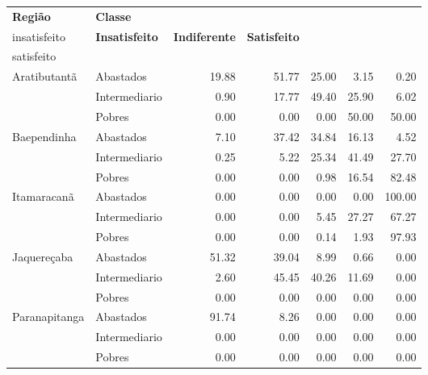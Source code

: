 \begin{table}[h]
\scriptsize
\centering
\label{tabela:q20p}
\begin{tabular}{ll rrrrr}
  \toprule
\textbf{Região}    & \textbf{Classe}  & \textbf{\specialcell{c}{Muito\\insatisfeito}} & \textbf{Insatisfeito} & \textbf{Indiferente} & \textbf{Satisfeito} & \textbf{\specialcell{c}{Muito\\satisfeito}}\\ 
   \midrule
Aratibutantã  & Abastados               &              19.88 &        51.77 &       25.00 &       3.15 &             0.20 \\ 
                & Intermediario           &               0.90 &        17.77 &       49.40 &      25.90 &             6.02 \\ 
                & Pobres                  &               0.00 &         0.00 &        0.00 &      50.00 &            50.00 \\ 
\midrule
  Baependinha   & Abastados               &               7.10 &        37.42 &       34.84 &      16.13 &             4.52 \\ 
                & Intermediario           &               0.25 &         5.22 &       25.34 &      41.49 &            27.70 \\ 
                & Pobres                  &               0.00 &         0.00 &        0.98 &      16.54 &            82.48 \\ 
\midrule
     Itamaracanã   & Abastados               &               0.00 &         0.00 &        0.00 &       0.00 &           100.00 \\ 
                & Intermediario           &               0.00 &         0.00 &        5.45 &      27.27 &            67.27 \\ 
                & Pobres                  &               0.00 &         0.00 &        0.14 &       1.93 &            97.93 \\ 
\midrule
     Jaquereçaba   & Abastados               &              51.32 &        39.04 &        8.99 &       0.66 &             0.00 \\ 
                & Intermediario           &               2.60 &        45.45 &       40.26 &      11.69 &             0.00 \\ 
                & Pobres                  &               0.00 &         0.00 &        0.00 &       0.00 &             0.00 \\ 
\midrule
     Paranapitanga & Abastados               &              91.74 &         8.26 &        0.00 &       0.00 &             0.00 \\ 
                & Intermediario           &               0.00 &         0.00 &        0.00 &       0.00 &             0.00 \\ 
                & Pobres                  &               0.00 &         0.00 &        0.00 &       0.00 &             0.00 \\ 
\bottomrule
\end{tabular}
\end{table}

